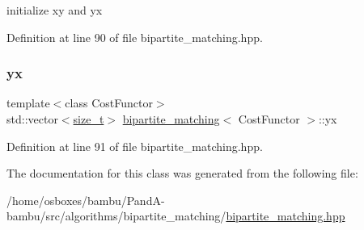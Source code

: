 initialize xy and yx 



Definition at line 90 of file bipartite\+\_\+matching.\+hpp.

\mbox{\label{classbipartite__matching_a186303695b7eb02918b19daf15c8e775}} 
\subsubsection{\texorpdfstring{yx}{yx}}
{\footnotesize\ttfamily template$<$class Cost\+Functor$>$ \\
std\+::vector$<$\hyperlink{tutorial__fpt__2017_2intro_2sixth_2test_8c_a7c94ea6f8948649f8d181ae55911eeaf}{size\+\_\+t}$>$ \hyperlink{classbipartite__matching}{bipartite\+\_\+matching}$<$ Cost\+Functor $>$\+::yx\hspace{0.3cm}{\ttfamily [private]}}



Definition at line 91 of file bipartite\+\_\+matching.\+hpp.



The documentation for this class was generated from the following file\+:\begin{DoxyCompactItemize}
\item 
/home/osboxes/bambu/\+Pand\+A-\/bambu/src/algorithms/bipartite\+\_\+matching/\hyperlink{bipartite__matching_8hpp}{bipartite\+\_\+matching.\+hpp}\end{DoxyCompactItemize}
